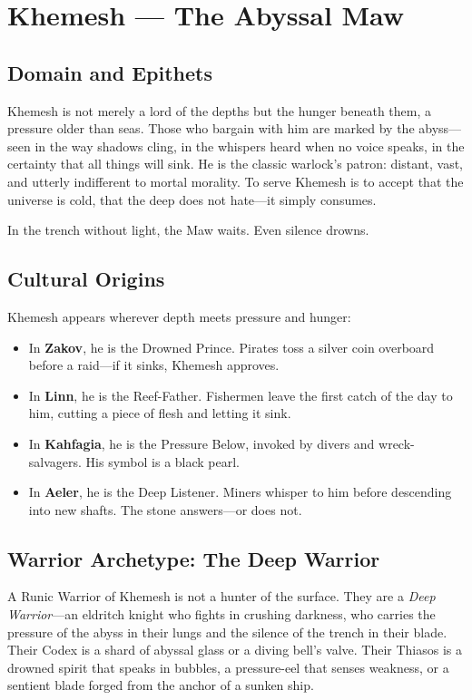 \section{Khemesh — The Abyssal Maw}

\subsection{Domain and Epithets}

Khemesh is not merely a lord of the depths but the hunger beneath them, a pressure older than seas. Those who bargain with him are marked by the abyss—seen in the way shadows cling, in the whispers heard when no voice speaks, in the certainty that all things will sink. He is the classic warlock's patron: distant, vast, and utterly indifferent to mortal morality. To serve Khemesh is to accept that the universe is cold, that the deep does not hate—it simply consumes.

In the trench without light, the Maw waits. Even silence drowns.

\subsection{Cultural Origins}

Khemesh appears wherever depth meets pressure and hunger:

\begin{itemize}
\item In \textbf{Zakov}, he is the Drowned Prince. Pirates toss a silver coin overboard before a raid—if it sinks, Khemesh approves.
\item In \textbf{Linn}, he is the Reef-Father. Fishermen leave the first catch of the day to him, cutting a piece of flesh and letting it sink.
\item In \textbf{Kahfagia}, he is the Pressure Below, invoked by divers and wreck-salvagers. His symbol is a black pearl.
\item In \textbf{Aeler}, he is the Deep Listener. Miners whisper to him before descending into new shafts. The stone answers—or does not.
\end{itemize}

\subsection{Warrior Archetype: The Deep Warrior}

A Runic Warrior of Khemesh is not a hunter of the surface. They are a \textit{Deep Warrior}—an eldritch knight who fights in crushing darkness, who carries the pressure of the abyss in their lungs and the silence of the trench in their blade. Their Codex is a shard of abyssal glass or a diving bell's valve. Their Thiasos is a drowned spirit that speaks in bubbles, a pressure-eel that senses weakness, or a sentient blade forged from the anchor of a sunken ship.

